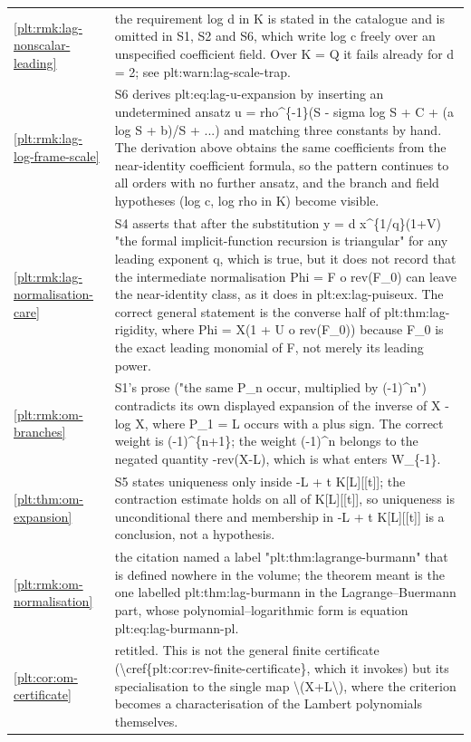 \documentclass[11pt,oneside]{article}
\theoremstyle{plain}
\theoremstyle{definition}
\theoremstyle{remark}
\begin{document}
\begin{longtable}{@{}p{} p{}@{}}
\cref{plt:rmk:lag-nonscalar-leading} & the requirement log d in K is stated in the catalogue and is omitted in S1, S2 and S6, which write log c freely over an unspecified coefficient field. Over K = Q it fails already for d = 2; see plt:warn:lag-scale-trap.\\
\cref{plt:rmk:lag-log-frame-scale} & S6 derives plt:eq:lag-u-expansion by inserting an undetermined ansatz u = rho\textasciicircum \{-1\}(S - sigma log S + C + (a log S + b)/S + ...) and matching three constants by hand. The derivation above obtains the same coefficients from the near-identity coefficient formula, so the pattern continues to all orders with no further ansatz, and the branch and field hypotheses (log c, log rho in K) become visible.\\
\cref{plt:rmk:lag-normalisation-care} & S4 asserts that after the substitution y = d x\textasciicircum \{1/q\}(1+V) "the formal implicit-function recursion is triangular" for any leading exponent q, which is true, but it does not record that the intermediate normalisation Phi = F o rev(F\_0) can leave the near-identity class, as it does in plt:ex:lag-puiseux. The correct general statement is the converse half of plt:thm:lag-rigidity, where Phi = X(1 + U o rev(F\_0)) because F\_0 is the exact leading monomial of F, not merely its leading power.\\
\cref{plt:rmk:om-branches} & S1's prose ("the same P\_n occur, multiplied by (-1)\textasciicircum n") contradicts its own displayed expansion of the inverse of X - log X, where P\_1 = L occurs with a plus sign. The correct weight is (-1)\textasciicircum \{n+1\}; the weight (-1)\textasciicircum n belongs to the negated quantity -rev(X-L), which is what enters W\_\{-1\}.\\
\cref{plt:thm:om-expansion} & S5 states uniqueness only inside -L + t K[L][[t]]; the contraction estimate holds on all of K[L][[t]], so uniqueness is unconditional there and membership in -L + t K[L][[t]] is a conclusion, not a hypothesis.\\
\cref{plt:rmk:om-normalisation} & the citation named a label "plt:thm:lagrange-burmann" that is defined nowhere in the volume; the theorem meant is the one labelled plt:thm:lag-burmann in the Lagrange--Buermann part, whose polynomial--logarithmic form is equation plt:eq:lag-burmann-pl.\\
\cref{plt:cor:om-certificate} & retitled. This is not the general finite certificate (\textbackslash cref\{plt:cor:rev-finite-certificate\}, which it invokes) but its specialisation to the single map \textbackslash (X+L\textbackslash ), where the criterion becomes a characterisation of the Lambert polynomials themselves.\\

\end{longtable}
\end{document}
